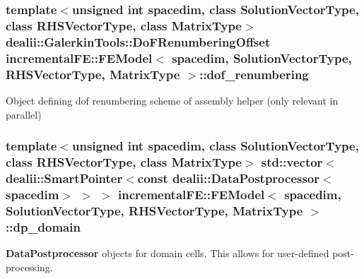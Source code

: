 \subsubsection[{\texorpdfstring{dof\+\_\+renumbering}{dof_renumbering}}]{\setlength{\rightskip}{0pt plus 5cm}template$<$unsigned int spacedim, class Solution\+Vector\+Type, class R\+H\+S\+Vector\+Type, class Matrix\+Type$>$ dealii\+::\+Galerkin\+Tools\+::\+Do\+F\+Renumbering\+Offset {\bf incremental\+F\+E\+::\+F\+E\+Model}$<$ spacedim, Solution\+Vector\+Type, R\+H\+S\+Vector\+Type, Matrix\+Type $>$\+::dof\+\_\+renumbering\hspace{0.3cm}{\ttfamily [private]}}\hypertarget{classincremental_f_e_1_1_f_e_model_ae3bd54f0440c5dcaf08066efd786c341}{}\label{classincremental_f_e_1_1_f_e_model_ae3bd54f0440c5dcaf08066efd786c341}
Object defining dof renumbering scheme of assembly helper (only relevant in parallel) 
\subsubsection[{\texorpdfstring{dp\+\_\+domain}{dp_domain}}]{\setlength{\rightskip}{0pt plus 5cm}template$<$unsigned int spacedim, class Solution\+Vector\+Type, class R\+H\+S\+Vector\+Type, class Matrix\+Type$>$ std\+::vector$<$dealii\+::\+Smart\+Pointer$<$const dealii\+::\+Data\+Postprocessor$<$spacedim$>$ $>$ $>$ {\bf incremental\+F\+E\+::\+F\+E\+Model}$<$ spacedim, Solution\+Vector\+Type, R\+H\+S\+Vector\+Type, Matrix\+Type $>$\+::dp\+\_\+domain\hspace{0.3cm}{\ttfamily [private]}}\hypertarget{classincremental_f_e_1_1_f_e_model_aff2f85b08282289389284138ca708eca}{}\label{classincremental_f_e_1_1_f_e_model_aff2f85b08282289389284138ca708eca}
{\bf Data\+Postprocessor} objects for domain cells. This allows for user-\/defined post-\/processing. 
